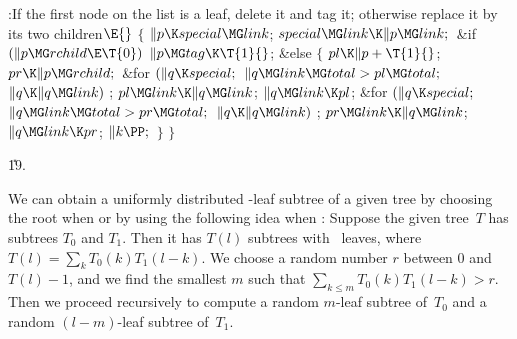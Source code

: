 \B{}:If the first node on the list is a leaf, delete it and tag it;
otherwise replace it by its two children\X${}\E{}$\6
${}\{{}$\1\6
${}\|p\K\\{special}\MG\\{link}{}$;\6
${}\\{special}\MG\\{link}\K\|p\MG\\{link};{}$\6
\&{if} ${}(\|p\MG\\{rchild}\E\T{0}){}$\1\5
${}\|p\MG\\{tag}\K\T{1}{}$;\2\6
\&{else}\5
${}\{{}$\1\6
${}\\{pl}\K\|p+\T{1}{}$;\5
${}\\{pr}\K\|p\MG\\{rchild};{}$\6
\&{for} ${}(\|q\K\\{special};{}$ ${}\|q\MG\\{link}\MG\\{total}>\\{pl}\MG%
\\{total};{}$ ${}\|q\K\|q\MG\\{link}){}$\1\5
;\2\6
${}\\{pl}\MG\\{link}\K\|q\MG\\{link}{}$;\5
${}\|q\MG\\{link}\K\\{pl}{}$;\6
\&{for} ${}(\|q\K\\{special};{}$ ${}\|q\MG\\{link}\MG\\{total}>\\{pr}\MG%
\\{total};{}$ ${}\|q\K\|q\MG\\{link}){}$\1\5
;\2\6
${}\\{pr}\MG\\{link}\K\|q\MG\\{link}{}$;\5
${}\|q\MG\\{link}\K\\{pr}{}$;\6
${}\|k\PP;{}$\6
\4${}\}{}$\2\6
\4${}\}{}$\2\par
\U19.\fi

We can obtain a uniformly distributed -leaf subtree of a given
tree
by choosing the root when  or by using the following idea when
:
Suppose the given tree~$T$ has subtrees $T_0$ and $T_1$. Then it has
$T(l)$ subtrees with ~leaves, where $T(l)=\sum_k T_0(k)T_1(l-k)$.
We choose a random number $r$ between 0 and $T(l)-1$, and we find the
smallest $m$ such that $\sum_{k\le m}T_0(k)T_1(l-k)>r$. Then we
proceed recursively to
compute a random $m$-leaf subtree of~$T_0$ and a random $(l-m)$-leaf
subtree of~$T_1$.

